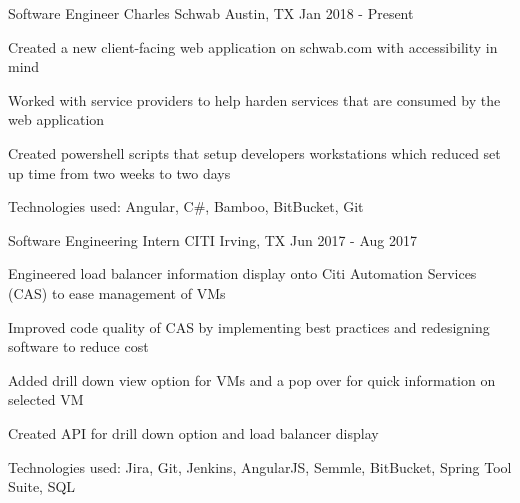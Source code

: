 

\begin{cventries}

  \cventry
    {Software Engineer} %
    {Charles Schwab} %
    {Austin, TX} %
    {Jan 2018 - Present} %
    {
      \begin{cvitems} %
        \item {Created a new client-facing web application on schwab.com with accessibility in mind }
        \item {Worked with service providers to help harden services that are consumed by the web application}
        \item {Created powershell scripts that setup developers workstations which reduced set up time from two weeks to two days}
        \item {Technologies used: Angular, C\#, Bamboo, BitBucket, Git }
      \end{cvitems}
    }
      
  \cventry
    {Software Engineering Intern} %
    {CITI} %
    {Irving, TX} %
    {Jun 2017 - Aug 2017} %
    {
      \begin{cvitems} %
        \item {Engineered load balancer information display onto Citi Automation Services (CAS) to ease management of VMs}
        \item {Improved code quality of CAS by implementing best practices and redesigning software to reduce cost}
        \item {Added drill down view option for VMs and a pop over for quick information on selected VM}
        \item {Created API for drill down option and load balancer display}
        \item {Technologies used: Jira, Git, Jenkins, AngularJS, Semmle, BitBucket, Spring Tool Suite, SQL }
      \end{cvitems}
    }


\end{cventries}
